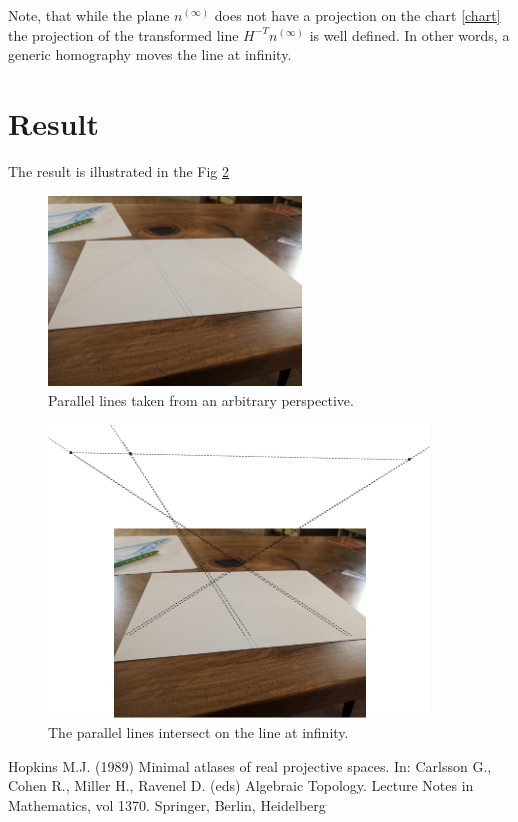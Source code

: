\documentclass[a4paper,10pt]{article}
\begin{document}
Note, that while the plane $n^{(\infty)}$ does not have a projection on the chart \eqref{chart} the projection of the  transformed line $H^{-T}n^{(\infty)}$ is well defined. In other words, a generic homography moves the line at infinity.


\section{Result}

The result is illustrated in the Fig \ref{fig:drawed}

\begin{figure}[h]
\centering
 \includegraphics[width=0.6\textwidth]{../../images/parallel.jpg}
 \caption{Parallel lines taken from an arbitrary perspective. }
 \label{fig:3dcart}
\end{figure}

\begin{figure}[h]
\centering
 \includegraphics[width=0.9\textwidth]{../../images/parallel.png}
 \caption{The parallel lines intersect on the line at infinity. }
 \label{fig:drawed}
\end{figure}

\begin{thebibliography}{1}
 Hopkins M.J. (1989) Minimal atlases of real projective spaces. In: Carlsson G., Cohen R., Miller H., Ravenel D. (eds) Algebraic Topology. Lecture Notes in Mathematics, vol 1370. Springer, Berlin, Heidelberg
\end{thebibliography}
\end{document}
